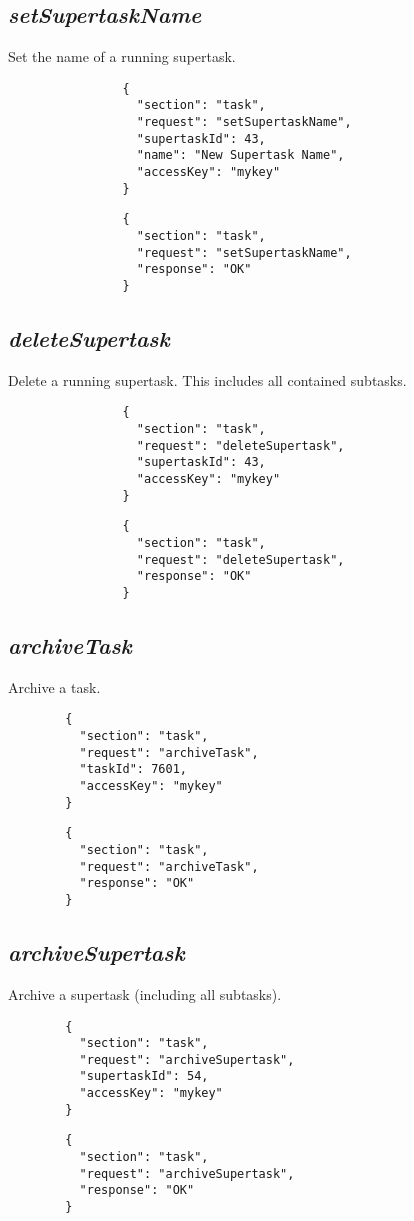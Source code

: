 		\subsection*{\textit{setSupertaskName}}
			Set the name of a running supertask.
			{
				\color{blue}
				\begin{verbatim}
				{
				  "section": "task",
				  "request": "setSupertaskName",
				  "supertaskId": 43,
				  "name": "New Supertask Name",
				  "accessKey": "mykey"
				}
				\end{verbatim}
			}
			{
				\color{OliveGreen}
				\begin{verbatim}
				{
				  "section": "task",
				  "request": "setSupertaskName",
				  "response": "OK"
				}
				\end{verbatim}
			}
		\subsection*{\textit{deleteSupertask}}
			Delete a running supertask. This includes all contained subtasks.
			{
				\color{blue}
				\begin{verbatim}
				{
				  "section": "task",
				  "request": "deleteSupertask",
				  "supertaskId": 43,
				  "accessKey": "mykey"
				}
				\end{verbatim}
			}
			{
				\color{OliveGreen}
				\begin{verbatim}
				{
				  "section": "task",
				  "request": "deleteSupertask",
				  "response": "OK"
				}
				\end{verbatim}
			}
\subsection*{\textit{archiveTask}}
	Archive a task.
	{
		\color{blue}
		\begin{verbatim}
		{
		  "section": "task",
		  "request": "archiveTask",
		  "taskId": 7601,
		  "accessKey": "mykey"
		}
		\end{verbatim}
	}
	{
		\color{OliveGreen}
		\begin{verbatim}
		{
		  "section": "task",
		  "request": "archiveTask",
		  "response": "OK"
		}
		\end{verbatim}
	}
\subsection*{\textit{archiveSupertask}}
	Archive a supertask (including all subtasks).
	{
		\color{blue}
		\begin{verbatim}
		{
		  "section": "task",
		  "request": "archiveSupertask",
		  "supertaskId": 54,
		  "accessKey": "mykey"
		}
		\end{verbatim}
	}
	{
		\color{OliveGreen}
		\begin{verbatim}
		{
		  "section": "task",
		  "request": "archiveSupertask",
		  "response": "OK"
		}
		\end{verbatim}
	}

